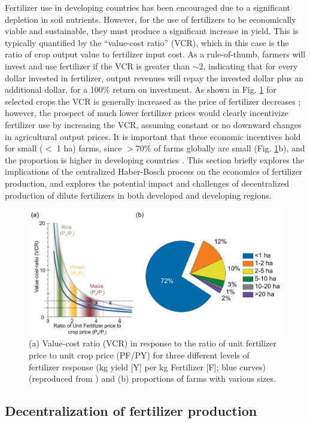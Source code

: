 Fertilizer use in developing countries has been encouraged due to a significant depletion in soil nutrients. However, for the use of fertilizers to be economically viable and sustainable, they must produce a significant increase in yield. This is typically quantified by the ``value-cost ratio'' (VCR), which in this case is the ratio of crop output value to fertilizer input cost. As a rule-of-thumb, farmers will invest and use fertilizer if the VCR is greater than $\sim$2, indicating that for every dollar invested in fertilizer, output revenues will repay the invested dollar plus an additional dollar, for a 100\% return on investment. As shown in Fig. \ref{fig:vcr} for selected crops the VCR is generally increased as the price of fertilizer decreases \cite{sommer_2013}; however, the prospect of much lower fertilizer prices would clearly incentivize fertilizer use by increasing the VCR, assuming constant or no downward changes in agricultural output prices. It is important that these economic incentives hold for small ($<$ 1 ha) farms, since $>$70\% of farms globally are small (Fig. \ref{fig:vcr}b), and the proportion is higher in developing countries \cite{Lowder_2016}. This section briefly explores the implications of the centralized Haber-Bosch process on the economics of fertilizer production, and explores the potential impact and challenges of decentralized production of dilute fertilizers in both developed and developing regions.
\begin{figure}
    \centering
    \includegraphics[width=.8\textwidth]{Figures/value_cost_ratio_farm_size.pdf}
    \caption{(a) Value-cost ratio (VCR) in response to the ratio of unit fertilizer price to unit crop price (PF/PY) for
three different levels of fertilizer response (kg yield [Y] per kg Fertilizer [F]; blue curves) \cite{sommer_2013} (reproduced from \cite{Lowder_2016}) and (b) proportions of farms with various sizes.}
    \label{fig:vcr}
\end{figure}

\subsection{Decentralization of fertilizer production}
\label{sec:decentralized}

